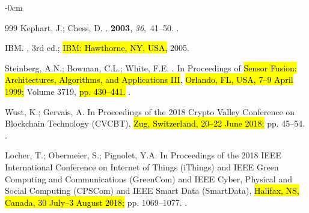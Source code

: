 \documentclass[blockchains,review,accept,moreauthors]{Definitions/mdpi}
\begin{document}
\begin{adjustwidth}{-\extralength}{0cm}
\begin{thebibliography}{999}
Kephart, J.; Chess, D.
.
 {\bf 2003}, {\em 36},~41--50.
.

{IBM}.
, 3rd ed.; \hl{IBM: Hawthorne, NY, USA, }
  2005.

Steinberg, A.N.; Bowman, C.L.; White, F.E.
.
\newblock In Proceedings of \hl{Sensor Fusion: Architectures, Algorithms, and Applications III}, \hl{Orlando, FL, USA, 7--9 April 1999;} Volume 3719, \hl{pp. 430--441.}
.

Wust, K.; Gervais, A.
\newblock In Proceedings of the 2018 Crypto Valley Conference on Blockchain
  Technology (CVCBT), \hl{Zug, Switzerland, 20--22 June 2018;} pp. 45--54.
.

Locher, T.; Obermeier, S.; Pignolet, Y.A.
\newblock In Proceedings of the 2018 IEEE International Conference on Internet
  of Things (iThings) and IEEE Green Computing and Communications (GreenCom)
  and IEEE Cyber, Physical and Social Computing (CPSCom) and IEEE Smart Data
  (SmartData), \hl{Halifax, NS, Canada, 30 July–3 August 2018;} pp. 1069--1077.
.


\end{thebibliography}
\end{adjustwidth}
\end{document}
